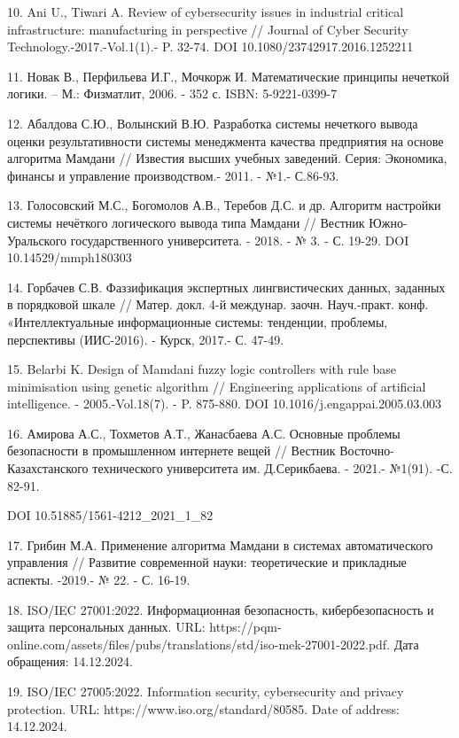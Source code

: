 \begin{references}
10. Ani U., Tiwari A. Review of cybersecurity issues in industrial
critical infrastructure: manufacturing in perspective // Journal of
Cyber Security Technology.-2017.-Vol.1(1).- P. 32-74. DOI
10.1080/23742917.2016.1252211

11. Новак В., Перфильева И.Г., Мочкорж И. Математические принципы
нечеткой логики. -- М.: Физматлит, 2006. - 352 с. ISBN: 5-9221-0399-7

12. Абалдова С.Ю., Волынский В.Ю. Разработка системы нечеткого вывода
оценки результативности системы менеджмента качества предприятия на
основе алгоритма Мамдани // Известия высших учебных заведений. Серия:
Экономика, финансы и управление производством.- 2011. - №1.- С.86-93.

13. Голосовский М.С., Богомолов А.В., Теребов Д.С. и др. Алгоритм
настройки системы нечёткого логического вывода типа Мамдани // Вестник
Южно-Уральского государственного университета. - 2018. - № 3. - С.
19-29. DOI 10.14529/mmph180303

14. Горбачев С.В. Фаззификация экспертных лингвистических данных,
заданных в порядковой шкале // Матер. докл. 4-й междунар. заочн.
Науч.-практ. конф. «Интеллектуальные информационные системы: тенденции,
проблемы, перспективы (ИИС-2016). - Курск, 2017.- С. 47-49.

15. Belarbi K. Design of Mamdani fuzzy logic controllers with rule base
minimisation using genetic algorithm // Engineering applications of
artificial intelligence. - 2005.-Vol.18(7). - P. 875-880. DOI
10.1016/j.engappai.2005.03.003

16. Амирова А.С., Тохметов А.Т., Жанасбаева А.С. Основные проблемы
безопасности в промышленном интернете вещей // Вестник
Восточно-Казахстанского технического университета им. Д.Серикбаева. -
2021.- №1(91). -С. 82-91.

DOI 10.51885/1561-4212\_2021\_1\_82

17. Грибин М.А. Применение алгоритма Мамдани в системах автоматического
управления // Развитие современной науки: теоретические и прикладные
аспекты. -2019.- № 22. - С. 16-19.

18. ISO/IEC 27001:2022. Информационная безопасность, кибербезопасность и
защита персональных данных. URL:
https://pqm-online.com/assets/files/pubs/translations/std/iso-mek-27001-2022.pdf.
Дата обращения: 14.12.2024.

19. ISO/IEC 27005:2022. Information security, cybersecurity and privacy
protection. URL: https://www.iso.org/standard/80585. Date of address:
14.12.2024.


\end{references}
